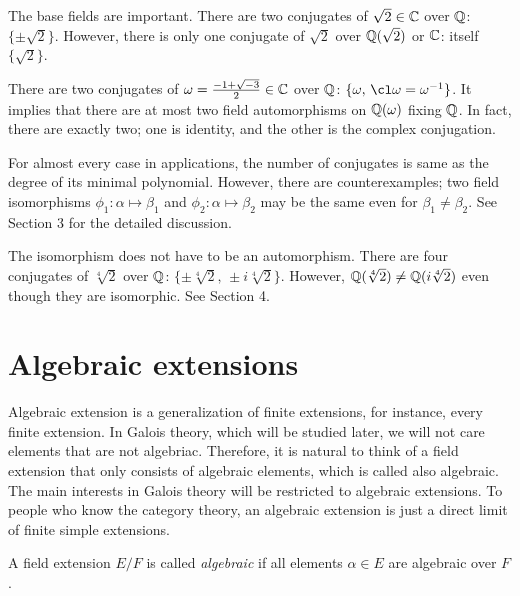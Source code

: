 \documentclass{../note}
\begin{document}
\begin{ex}
The base fields are important.
There are two conjugates of $\sqrt2\in\mathbb{C}$ over $\mathbb{Q}$: $\{\pm\sqrt2\}$.
However, there is only one conjugate of $\sqrt2$ over $\mathbb{Q}(\sqrt2)$ or $\mathbb{C}$: itself $\{\sqrt2\}$.
\end{ex}

\begin{ex}
There are two conjugates of $\omega=\frac{-1+\sqrt{-3}}2\in\mathbb{C}$ over $\mathbb{Q}$: $\{\omega,\,\cl\omega=\omega^{-1}\}$.
It implies that there are at most two field automorphisms on $\mathbb{Q}(\omega)$ fixing $\mathbb{Q}$.
In fact, there are exactly two; one is identity, and the other is the complex conjugation.
\end{ex}

\begin{ex}
For almost every case in applications, the number of conjugates is same as the degree of its minimal polynomial.
However, there are counterexamples; two field isomorphisms $\phi_1:\alpha\mapsto\beta_1$ and $\phi_2:\alpha\mapsto\beta_2$ may be the same even for $\beta_1\ne\beta_2$.
See Section 3 for the detailed discussion.
\end{ex}

\begin{ex}
The isomorphism does not have to be an automorphism.
There are four conjugates of $\sqrt[4]2$ over $\mathbb{Q}$: $\{\pm\sqrt[4]2,\,\pm i\sqrt[4]2\}$.
However, $\mathbb{Q}(\sqrt[4]2)\ne\mathbb{Q}(i\sqrt[4]2)$ even though they are isomorphic.
See Section 4.
\end{ex}




\section{Algebraic extensions}

Algebraic extension is a generalization of finite extensions, for instance, every finite extension.
In Galois theory, which will be studied later, we will not care elements that are not algebriac.
Therefore, it is natural to think of a field extension that only consists of algebraic elements, which is called also algebraic.
The main interests in Galois theory will be restricted to algebraic extensions.
To people who know the category theory, an algebraic extension is just a direct limit of finite simple extensions.

\begin{defn}
A field extension $E/F$ is called \emph{algebraic} if all elements $\alpha\in E$ are algebraic over $F$.
\end{defn}
\end{document}
